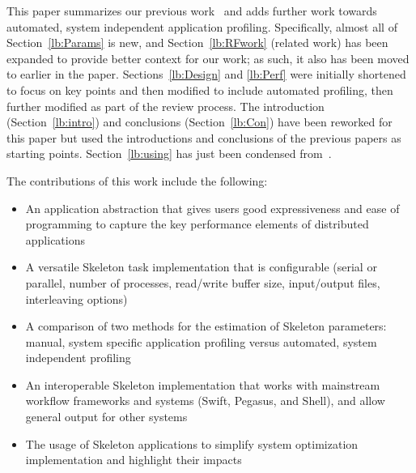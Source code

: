 \documentclass[preprint,12pt]{elsarticle}
\begin{document}


This paper summarizes our previous work~\cite{Skeleton2013,Skeleton2014} and adds further work towards automated, system independent application profiling. 
Specifically, almost all of Section~\ref{lb:Params} is new, and Section~\ref{lb:RFwork} (related work) has been expanded to provide better context for our work; as such, it also has been moved to earlier in the paper.
Sections~\ref{lb:Design} and \ref{lb:Perf} were initially shortened to focus on key points and then modified to include automated profiling, then further modified as part of the review process.  
The introduction (Section~\ref{lb:intro}) and conclusions (Section~\ref{lb:Con}) have been reworked for this paper but used the introductions and conclusions of the previous papers as starting points.
Section~\ref{lb:using} has just been condensed from~\cite{Skeleton2014}.

The contributions of this work include the following:
\begin{itemize}
\item An application abstraction that gives users good expressiveness and ease of programming to capture the key performance elements of distributed applications
\item A versatile Skeleton task implementation that is configurable (serial or parallel, number of processes, read/write buffer size, input/output files, interleaving options)
\item A comparison of two methods for the estimation
    of Skeleton parameters: manual, system specific application profiling
    versus automated, system independent profiling 
\item An interoperable Skeleton implementation that works with mainstream workflow frameworks and systems (Swift, Pegasus, and Shell), and allow general output for other systems
\item The usage of Skeleton applications to simplify system optimization implementation and highlight their impacts
\end{itemize}
\end{document}
